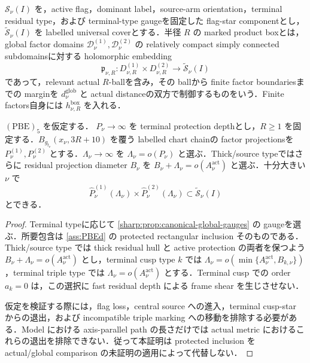 \documentclass[a4paper,11pt]{ltjsarticle}
\numberwithin{equation}{section}
\theoremstyle{plain}
\theoremstyle{definition}
\theoremstyle{remark}
\begin{document}
\begin{definition}\label{sharp:def:marked-product-box}
$\mathscr S_{\nu}(I)$ を，active flag，dominant label，source-arm orientation，terminal residual type，および terminal-type gaugeを固定した flag-star componentとし，$\widetilde{\mathscr S}_{\nu}(I)$ を labelled universal coverとする．半径 $R$ の marked product boxとは，global factor domains $\mathscr D^{(1)}_\nu,\mathscr D^{(2)}_\nu$ の relatively compact simply connected subdomainsに対する holomorphic embedding
\[
 \mathfrak p_{\nu,R}:D_{\nu,R}^{(1)}\times D_{\nu,R}^{(2)}
 \longrightarrow \widetilde{\mathscr S}_{\nu}(I)
\]
であって，relevant actual $R$-ballを含み，その ballから finite factor boundariesまでの marginを $d^{\mathrm{glob}}_\nu$ と actual distanceの双方で制御するものをいう．Finite factors自身には $h^{\mathrm{box}}_{\nu,R}$ を入れる．
\end{definition}

\begin{lemma}\label{sharp:lem:flag-star-rectangular-hull}
$\mathrm{(PBE)}_5$ を仮定する．
$P_\nu\to\infty$ を terminal protection depthとし，$R\ge1$ を固定する．$B_{g_{t_\nu}}(x_\nu,3R+10)$ を覆う labelled chart chainの factor projectionsを $P_\nu^{(1)},P_\nu^{(2)}$ とする．$\Lambda_\nu\to\infty$ を $\Lambda_\nu=o(P_\nu)$ と選ぶ．Thick/source typeではさらに residual projection diameter $B_\nu$ を $B_\nu+\Lambda_\nu=o(A_\nu^{\mathrm{act}})$ と選ぶ．十分大きい $\nu$ で
\begin{equation}\label{sharp:eq:rectangular-hull-inclusion}
 \widehat P_\nu^{(1)}(\Lambda_\nu)\times
 \widehat P_\nu^{(2)}(\Lambda_\nu)
 \subset \widetilde{\mathscr S}_{\nu}(I)
\end{equation}
とできる．
\end{lemma}

\begin{proof}
Terminal typeに応じて \cref{sharp:prop:canonical-global-gauges} の gaugeを選ぶ．所要包含は \cref{ass:PBEd} の protected rectangular inclusion そのものである．Thick/source type では thick residual hull と active protection の両者を保つよう $B_\nu+\Lambda_\nu=o(A_\nu^{\mathrm{act}})$ とし，terminal cusp type $k$ では $\Lambda_\nu=o(\min\{A_\nu^{\mathrm{act}},B_{k,\nu}\})$，terminal triple type では $\Lambda_\nu=o(A_\nu^{\mathrm{act}})$ とする．Terminal cusp での order $a_k=0$ は，この選択に fast residual depth による frame shear を生じさせない．

仮定を検証する際には，flag loss，central source への進入，terminal cusp-star からの退出，および incompatible triple marking への移動を排除する必要がある．Model における axis-parallel path の長さだけでは actual metric におけるこれらの退出を排除できない．従って本証明は protected inclusion を actual/global comparison の未証明の適用によって代替しない．
\end{proof}
\end{document}
